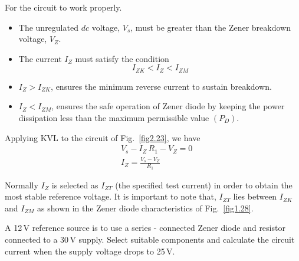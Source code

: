 For the circuit to work properly.
\begin{itemize}
\item The unregulated $dc$ voltage, $V_{s}$, must be greater than the Zener breakdown voltage, $V_{Z}$.

\item The current $I_{Z}$ must satisfy the condition
$$
I_{ZK}<I_{Z}<I_{ZM}
$$

\item $I_{Z}>I_{ZK}$, ensures the minimum reverse current to sustain breakdown.

\item $I_{Z}<I_{ZM}$, ensures the safe operation of Zener diode by keeping the power dissipation less than the maximum permissible value $(P_{D})$.
\end{itemize}

Applying KVL to the circuit of Fig.~\ref{fig2.23}, we have
\begin{align}
& V_{s}-I_{Z}\,R_{1}-V_{Z}=0\label{eq2.79}\\[3pt]
& I_{Z}=\frac{V_{s}-V_{Z}}{R_{1}}\label{eq2.80}
\end{align}

Normally $I_{Z}$ is selected as $I_{ZT}$ (the specified test current) in order to obtain the most stable reference voltage. It is important to note that, $I_{ZT}$ lies between $I_{ZK}$ and $I_{ZM}$ as shown in the Zener diode characteristics of Fig.~\ref{fig1.28}.

\begin{example}\label{exam2.25}
A 12\,V reference source is to use a series - connected Zener diode and resistor connected to a 30\,V supply. Select suitable components and calculate the circuit current when the supply voltage drops to 25\,V.
\end{example}

